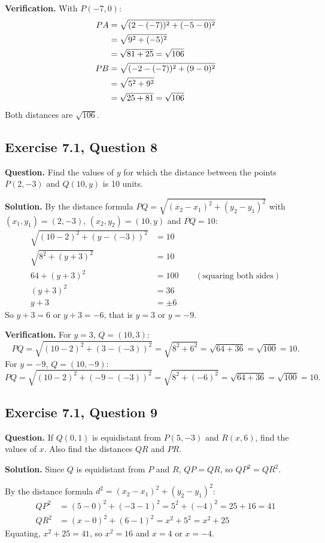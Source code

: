 \textbf{Verification.} With $P(-7,0)$:
\begin{align*}
\distn{PA}{-7}{0}{2}{-5}\\
\distn{PB}{-7}{0}{-2}{9}
\end{align*}
Both distances are $\sqrt{106}$.


\subsection*{Exercise 7.1, Question 8}
\textbf{Question.} Find the values of $y$ for which the distance between the points $P(2,-3)$ and $Q(10,y)$ is 10 units.

\textbf{Solution.} By the distance formula $PQ=\sqrt{(x_2-x_1)^2+(y_2-y_1)^2}$ with $(x_1,y_1)=(2,-3)$, $(x_2,y_2)=(10,y)$ and $PQ=10$:
\begin{align*}
\sqrt{(10-2)^2+(y-(-3))^2}&=10\\
\sqrt{8^2+(y+3)^2}&=10\\
64+(y+3)^2&=100\qquad(\text{squaring both sides})\\
(y+3)^2&=36\\
y+3&=\pm6
\end{align*}
So $y+3=6$ or $y+3=-6$, that is $y=3$ or $y=-9$.

\textbf{Verification.} For $y=3$, $Q=(10,3)$:
\[PQ=\sqrt{(10-2)^2+(3-(-3))^2}=\sqrt{8^2+6^2}=\sqrt{64+36}=\sqrt{100}=10.\]
For $y=-9$, $Q=(10,-9)$:
\[PQ=\sqrt{(10-2)^2+(-9-(-3))^2}=\sqrt{8^2+(-6)^2}=\sqrt{64+36}=\sqrt{100}=10.\]


\subsection*{Exercise 7.1, Question 9}
\textbf{Question.} If $Q(0,1)$ is equidistant from $P(5,-3)$ and $R(x,6)$, find the values of $x$. Also find the distances $QR$ and $PR$.

\textbf{Solution.} Since $Q$ is equidistant from $P$ and $R$, $QP=QR$, so $QP^2=QR^2$.

By the distance formula $d^2=(x_2-x_1)^2+(y_2-y_1)^2$:
\begin{align*}
QP^2&=(5-0)^2+(-3-1)^2=5^2+(-4)^2=25+16=41\\
QR^2&=(x-0)^2+(6-1)^2=x^2+5^2=x^2+25
\end{align*}
Equating, $x^2+25=41$, so $x^2=16$ and $x=4$ or $x=-4$.


